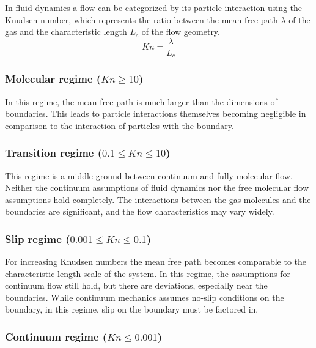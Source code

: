 	In fluid dynamics a flow can be categorized by its particle interaction using the Knudsen number, which represents the ratio between the mean-free-path $\lambda$ of the gas and the characteristic length $L_c$ of the flow geometry.
	\begin{equation}
		Kn=\frac{\lambda}{L_c}
		\label{eq:knudsen-number}
	\end{equation}

\subsubsection*{Molecular regime (\(Kn \geq 10\))}

	In this regime, the mean free path is much larger than the dimensions of boundaries.
	This leads to particle interactions themselves becoming negligible in comparison to the interaction of particles with the boundary.

	

\subsubsection*{Transition regime (\(0.1 \leq Kn \leq 10\))}
	
	This regime is a middle ground between continuum and fully molecular flow.
	Neither the continuum assumptions of fluid dynamics nor the free molecular flow assumptions hold completely.
	The interactions between the gas molecules and the boundaries are significant, and the flow characteristics may vary widely.

\subsubsection*{Slip regime (\(0.001 \leq Kn \leq 0.1\))}

	For increasing Knudsen numbers the mean free path becomes comparable to the characteristic length scale of the system.
	In this regime, the assumptions for continuum flow still hold, but there are deviations, especially near the boundaries.
	While continuum mechanics assumes no-slip conditions on the boundary, in this regime, slip on the boundary must be factored in.

	

\subsubsection*{Continuum regime (\(Kn \leq 0.001\))}
	
